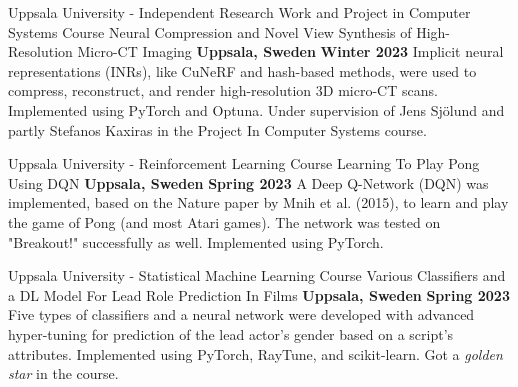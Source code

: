 

\begin{cventries}


        \cventry
        {Uppsala University - Independent Research Work and Project in Computer Systems Course} %
        {Neural Compression and Novel View Synthesis of High-Resolution Micro-CT Imaging} %
        {\textbf{Uppsala, Sweden}} %
        {\textbf{Winter 2023}} %
        {
            Implicit neural representations (INRs), like CuNeRF and hash-based methods, were used to compress, reconstruct, and render high-resolution 3D micro-CT scans. Implemented using PyTorch and Optuna. Under supervision of Jens Sjölund and partly Stefanos Kaxiras in the Project In Computer Systems course.
        }
        
       \cventry
        {Uppsala University - Reinforcement Learning Course} %
        {Learning To Play Pong Using DQN} %
        {\textbf{Uppsala, Sweden}} %
        {\textbf{Spring 2023}} %
        {
            A Deep Q-Network (DQN) was implemented, based on the Nature paper by Mnih et al. (2015), to learn and play the game of Pong (and most Atari games). The network was tested on "Breakout!" successfully as well. Implemented using PyTorch.
        }


       \cventry
        {Uppsala University - Statistical Machine Learning Course} %
        {Various Classifiers and a DL Model For Lead Role Prediction In Films} %
        {\textbf{Uppsala, Sweden}} %
        {\textbf{Spring 2023}} %
        {
            Five types of classifiers and a neural network were developed with advanced hyper-tuning for prediction of the lead actor's gender based on a script's attributes. Implemented using PyTorch, RayTune, and scikit-learn. Got a \emph{golden star} in the course.
        }


\end{cventries}
